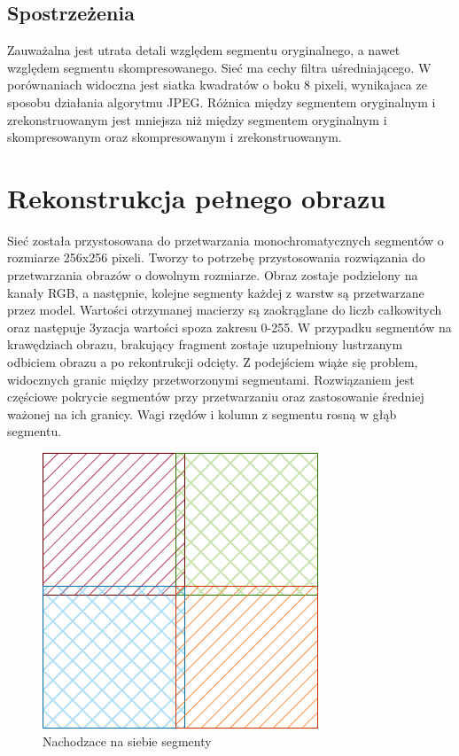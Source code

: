 \documentclass[a4paper, 12pt]{article}
\begin{document}
\subsection{Spostrzeżenia}
Zauważalna jest utrata detali względem segmentu oryginalnego, a nawet względem segmentu skompresowanego. Sieć ma cechy filtra uśredniającego.
W porównaniach widoczna jest siatka kwadratów o boku 8 pixeli, wynikajaca ze sposobu działania algorytmu JPEG.
Różnica między segmentem oryginalnym i zrekonstruowanym jest mniejsza niż między segmentem oryginalnym i skompresowanym oraz skompresowanym i zrekonstruowanym.

\section{Rekonstrukcja pełnego obrazu}
Sieć została przystosowana do przetwarzania monochromatycznych segmentów o rozmiarze 256x256 pixeli.
Tworzy to potrzebę przystosowania rozwiązania do przetwarzania obrazów o dowolnym rozmiarze.
Obraz zostaje podzielony na kanały RGB, a następnie, kolejne segmenty każdej z warstw są przetwarzane przez model.
Wartości otrzymanej macierzy są zaokrąglane do liczb całkowitych oraz następuje 3yzacja wartości spoza zakresu 0-255.
W przypadku segmentów na krawędziach obrazu, brakujący fragment zostaje uzupełniony lustrzanym odbiciem obrazu a po rekontrukcji odcięty.
Z podejściem wiąże się problem, widocznych granic między przetworzonymi segmentami.
Rozwiązaniem jest częściowe pokrycie segmentów przy przetwarzaniu oraz zastosowanie średniej ważonej na ich granicy.
Wagi rzędów i kolumn z segmentu rosną w głąb segmentu.
\\
\begin{figure}[h!]
\begin{center}
	\includegraphics[width=0.5\columnwidth]{overlap.png}
	\caption{Nachodzace na siebie segmenty}
\end{center}
\end{figure}
\end{document}
